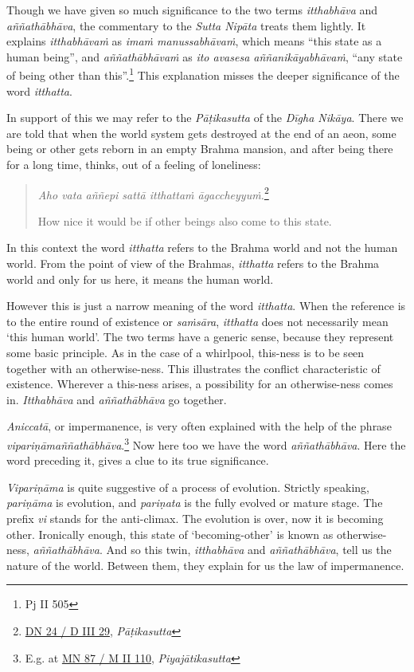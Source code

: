 Though we have given so much significance to the two terms \emph{itthabhāva} and \emph{aññathābhāva}, the commentary to the \emph{Sutta Nipāta} treats them lightly. It explains \emph{itthabhāvaṁ} as \emph{imaṁ manussabhāvaṁ}, which means ``this state as a human being'', and \emph{aññathābhāvaṁ} as \emph{ito avasesa aññanikāyabhāvaṁ}, ``any state of being other than this''.\footnote{Pj II 505} This explanation misses the deeper significance of the word \emph{itthatta}.

In support of this we may refer to the \emph{Pāṭikasutta} of the \emph{Dīgha Nikāya}. There we are told that when the world system gets destroyed at the end of an aeon, some being or other gets reborn in an empty Brahma mansion, and after being there for a long time, thinks, out of a feeling of loneliness:

\begin{quote}
\emph{Aho vata aññepi sattā itthattaṁ āgaccheyyuṁ.}\footnote{\href{https://suttacentral.net/dn24/pli/ms}{DN 24 / D III 29}, \emph{Pāṭikasutta}}

How nice it would be if other beings also come to this state.
\end{quote}

In this context the word \emph{itthatta} refers to the Brahma world and not the human world. From the point of view of the Brahmas, \emph{itthatta} refers to the Brahma world and only for us here, it means the human world.

However this is just a narrow meaning of the word \emph{itthatta}. When the reference is to the entire round of existence or \emph{saṁsāra}, \emph{itthatta} does not necessarily mean `this human world'. The two terms have a generic sense, because they represent some basic principle. As in the case of a whirlpool, this-ness is to be seen together with an otherwise-ness. This illustrates the conflict characteristic of existence. Wherever a this-ness arises, a possibility for an otherwise-ness comes in. \emph{Itthabhāva} and \emph{aññathābhāva} go together.

\emph{Aniccatā}, or impermanence, is very often explained with the help of the phrase \emph{vipariṇāmaññathābhāva}.\footnote{E.g. at \href{https://suttacentral.net/mn87/pli/ms}{MN 87 / M II 110}, \emph{Piyajātikasutta}} Now here too we have the word \emph{aññathābhāva}. Here the word preceding it, gives a clue to its true significance.

\emph{Vipariṇāma} is quite suggestive of a process of evolution. Strictly speaking, \emph{pariṇāma} is evolution, and \emph{pariṇata} is the fully evolved or mature stage. The prefix \emph{vi} stands for the anti-climax. The evolution is over, now it is becoming other. Ironically enough, this state of `becoming-other' is known as otherwise-ness, \emph{aññathābhāva}. And so this twin, \emph{itthabhāva} and \emph{aññathābhāva}, tell us the nature of the world. Between them, they explain for us the law of impermanence.

